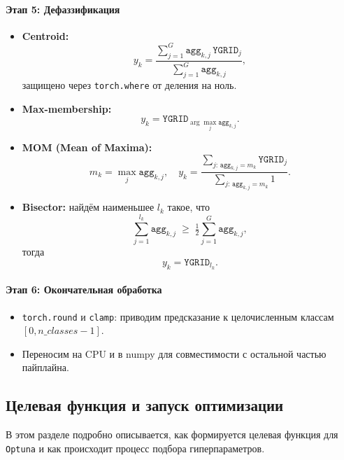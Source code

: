 \paragraph{Этап 5: Дефаззификация}  
\begin{itemize}
  \item {\bf Centroid:}  
    $$
      y_k
      = \frac{\sum_{j=1}^G \texttt{agg}_{k,j}\,\texttt{YGRID}_j}
             {\sum_{j=1}^G \texttt{agg}_{k,j}},
    $$
    защищено через \texttt{torch.where} от деления на ноль.
  \item {\bf Max-membership:}  
    $$
      y_k
      = \texttt{YGRID}_{\displaystyle\arg\max_j \texttt{agg}_{k,j}}.
    $$
  \item {\bf MOM (Mean of Maxima):}  
    $$
      m_k = \max_j \texttt{agg}_{k,j},\quad
      y_k
      = \frac{\sum_{j:\,\texttt{agg}_{k,j}=m_k} \texttt{YGRID}_j}
             {\sum_{j:\,\texttt{agg}_{k,j}=m_k} 1}.
    $$
  \item {\bf Bisector:}  
    найдём наименьшее $l_k$ такое, что
    $$
      \sum_{j=1}^{l_k} \texttt{agg}_{k,j}
      \;\ge\;
      \tfrac12 \sum_{j=1}^G \texttt{agg}_{k,j},
    $$
    тогда
    $$
      y_k = \texttt{YGRID}_{l_k}.
    $$
\end{itemize}

\paragraph{Этап 6: Окончательная обработка}
\begin{itemize}
  \item \texttt{torch.round} и \texttt{clamp}: приводим предсказание к целочисленным классам \([0, n\_classes-1]\).
  \item Переносим на CPU и в numpy для совместимости с остальной частью пайплайна.
\end{itemize}


\subsection{Целевая функция и запуск оптимизации}

В этом разделе подробно описывается, как формируется целевая функция для \texttt{Optuna} и как происходит процесс подбора гиперпараметров.

